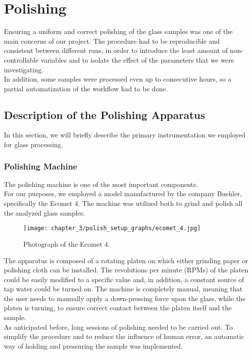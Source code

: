 \section{Polishing}
\label{Polishing}
Ensuring a uniform and correct polishing of the glass samples was one of the main concerns of our project. The procedure had to be reproducible and consistent between different runs, in order to introduce the least amount of non-controllable variables and to isolate the effect of the parameters that we were investigating.
\\
In addition, some samples were processed even up to consecutive hours, so a partial automatization of the workflow had to be done.
\subsection{Description of the Polishing Apparatus}
\label{subsec:description_polish_apparatus}
In this section, we will briefly describe the primary instrumentation we employed for glass processing.

\subsubsection{Polishing Machine}
\label{subsubsec:polishing_machine}
The polishing machine is one of the most important components.
\\
For our purposes, we employed a model manufactured by the company Buehler, specifically the Ecomet 4. The machine was utilized both to grind and polish all the analyzed glass samples. 
\begin{figure}[H]
    \centering
    \texttt{[image: chapter\_3/polish\_setup\_graphs/ecomet\_4.jpg]} 
    \caption{Photograph of the Ecomet 4.}
    \label{fig:ecomet_4}
\end{figure}
The apparatus is composed of a rotating platen on which either grinding paper or polishing cloth can be installed. The revolutions per minute (RPMs) of the platen could be easily modified to a specific value and, in addition, a constant source of tap water could be turned on. The machine is completely manual, meaning that the user needs to manually apply a down-pressing force upon the glass, while the platen is turning, to ensure correct contact between the platen itself and the sample.
\\
As anticipated before, long sessions of polishing needed to be carried out. To simplify the procedure and to reduce the influence of human error, an automatic way of holding and pressuring the sample was implemented.

